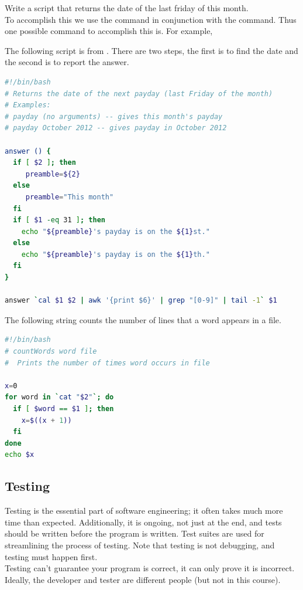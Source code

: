 \documentclass[english, 11pt]{article}
\begin{document}
    \begin{exmp}
      Write a script that returns the date of the last friday of this month. \\ To accomplish this we use the  command in conjunction with the  command. Thus one possible command to accomplish this is. For example,
      \begin{center}
      \end{center}
      The following script is from . There are two steps, the first is to find the date and the second is to report the answer.
      \begin{lstlisting}[language=bash]
#!/bin/bash
# Returns the date of the next payday (last Friday of the month)
# Examples:
# payday (no arguments) -- gives this month's payday
# payday October 2012 -- gives payday in October 2012

answer () {
  if [ $2 ]; then
     preamble=${2}
  else
     preamble="This month"
  fi
  if [ $1 -eq 31 ]; then
    echo "${preamble}'s payday is on the ${1}st."
  else
    echo "${preamble}'s payday is on the ${1}th."
  fi
}

answer `cal $1 $2 | awk '{print $6}' | grep "[0-9]" | tail -1` $1
      \end{lstlisting}
    \end{exmp}

    \begin{exmp}
      The following string counts the number of lines that a word appears in a file.
      \begin{lstlisting}[language=bash]
#!/bin/bash
# countWords word file
#  Prints the number of times word occurs in file

x=0
for word in `cat "$2"`; do
  if [ $word == $1 ]; then
    x=$((x + 1))
  fi
done
echo $x
      \end{lstlisting}
    \end{exmp}

    \subsection{Testing}

    Testing is the essential part of software engineering; it often takes much more time than expected. Additionally, it is ongoing, not just at the end, and tests should be written before the program is written. Test suites are used for streamlining the process of testing. Note that testing is not debugging, and testing must happen first. \\ Testing can't guarantee your program is correct, it can only prove it is incorrect. Ideally, the developer and tester are different people (but not in this course).
\end{document}
